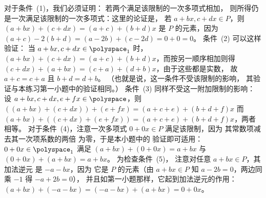 \begin{exercises}
\begin{answer}
\begin{exparts}
          对于条件~(1)，我们必须证明：
          若两个满足该限制的一次多项式相加，
          则所得仍是一次满足该限制的一次多项式：这里的论证是，
          若 $a+bx,c+dx\in P$，则
          $(a+bx)+(c+dx)=(a+c)+(b+d)x$ 是 $P$ 的元素，因为
          $(a+c)-2(b+d)=(a-2b)+(c-2d)=0+0=0$。
          条件~(2) 可以这样验证：
          当 $a+bx,c+dx\in\polyspace_1$ 时，
          $(a+bx)+(c+dx)=(a+c)+(b+d)x$，而按另一顺序相加则得
          $(c+dx)+(a+bx)=(c+a)+(d+b)x$，由于这些都是实数，
          故 $a+c=c+a$
          且 $b+d=d+b$。
          （也就是说，这一条件不受该限制的影响，
          其验证与本练习第一小题中的验证相同。）
          条件~(3) 同样不受这一附加限制的影响：
          设
          $a+bx,c+dx,e+fx\in\polyspace$，则
          $((a+bx)+(c+dx))+(e+fx)=(a+c+e)+(b+d+f)x$
          而
          $(a+bx)+((c+dx)+(e+fx))=(a+c+e)+(b+d+f)x$，两者相等。
          对于条件~(4)，注意一次多项式
          $0+0x\in P$ 满足该限制，因为
          其常数项减去其一次项系数的两倍
          为零，于是本小题中的
          验证即可适用：
          $0+0x\in\polyspace_1$ 满足
          $(a+bx)+(0+0x)=a+bx$ 与
          $(0+0x)+(a+bx)=a+bx$。
          为检查条件~(5)，
          注意对任意 $a+bx\in P$，其加法逆元
          是 $-a-bx$，因为
          它是 $P$ 的元素（由 $a+bx\in P$ 知
          $a-2b=0$，两边同乘 $-1$ 得 $-a+2b=0$），
          并且如第一小题那样，它起到加法逆元的作用：
          $(a+bx)+(-a-bx)=(-a-bx)+(a+bx)=0+0x$。


\end{exparts}
\end{answer}
\end{exercises}
